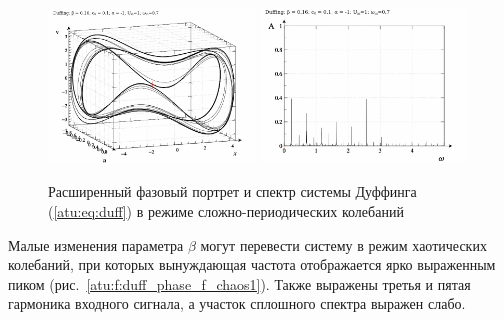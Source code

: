 \begin{figure}[ht!]
\begin{center}
  \includegraphics[width=0.49\textwidth]{p/cha/duff/duff_p_1x00_0x70_0x16.png}
  \hfill
  \includegraphics[width=0.49\textwidth]{p/cha/duff/duff_f_1x00_0x70_0x16.png}
\end{center}
  \caption{Расширенный фазовый портрет и спектр системы Дуффинга (\ref{atu:eq:duff}) в режиме сложно-периодических колебаний}
\label{atu:f:duff_phase_f_reg}
\end{figure}

Малые изменения параметра $\beta$ могут перевести систему в режим хаотических
колебаний, при которых вынуждающая частота отображается ярко выраженным пиком
(рис.~\ref{atu:f:duff_phase_f_chaos1}). Также выражены
третья и пятая гармоника входного сигнала,
а участок сплошного спектра выражен слабо.

